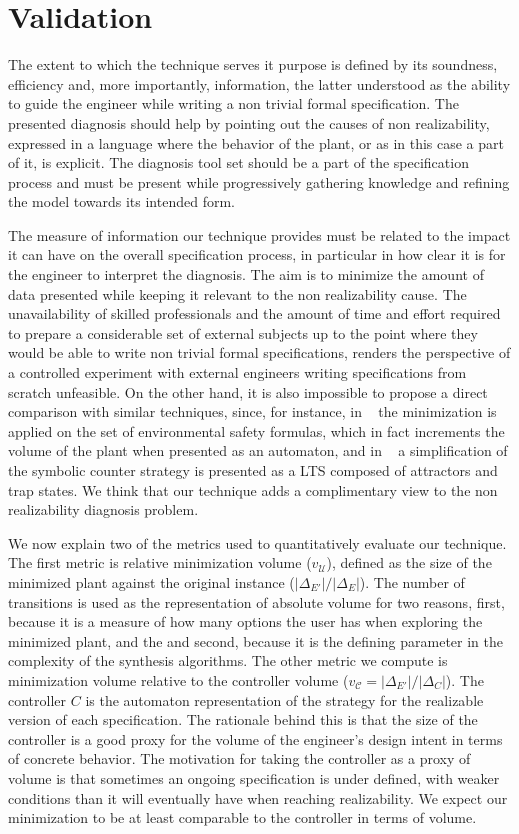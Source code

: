 \section{Validation}
The extent to which the technique serves it purpose is defined by its soundness, efficiency and, more importantly, information, the latter understood as the ability to guide the engineer while writing a non trivial formal specification. The presented diagnosis should help by pointing out the causes of non realizability, expressed in a language where the behavior of the plant, or as in this case a part of it, is explicit. The diagnosis tool set should be a part of the specification process and must be present while progressively gathering knowledge and refining the model towards its intended form.

The measure of information our technique provides must be related to the impact it can have on the overall specification process, in particular in how clear it is for the engineer  to interpret the diagnosis. The aim is to minimize the amount of data presented while keeping it relevant to the non realizability cause. The unavailability of skilled professionals and the amount of time and effort required to prepare a considerable set of external subjects up to the point where they would be able to write non trivial formal specifications, renders the perspective of a controlled experiment with external engineers writing specifications from scratch unfeasible. On the other hand, it is also impossible to propose a direct comparison with similar techniques, since, for instance, in ~\cite{DBLP:conf/hvc/KonighoferHB10} the minimization is applied on the set of environmental safety formulas, which in fact increments the volume of the plant when presented as an automaton, and in ~\cite{DBLP:conf/sigsoft/KuventMR17} a simplification of the symbolic counter strategy is presented as a LTS composed of attractors and trap states. We think that our technique adds a complimentary view to the non realizability diagnosis problem.

We now explain two of the metrics used to quantitatively evaluate our technique. The first metric is relative minimization volume ($v_{\mathcal{U}}$), defined as the size of the minimized plant against the original instance ($|\Delta_{E'}|/|\Delta_{E}|$). 
The number of transitions is used as the representation of absolute volume for two reasons, first, because it is a measure of how many options the user has when exploring the minimized plant, and the  and second, because it is the defining parameter in the complexity of the synthesis algorithms. 
The other metric we compute is minimization volume relative to the controller volume ($v_{\mathcal{C}}=|\Delta_{E'}|/|\Delta_{C}|$). The controller $C$ is the automaton representation of the strategy for the realizable version of each specification. The rationale behind this is that the size of the controller is a good proxy for the volume of the engineer's design intent in terms of concrete behavior. The motivation for taking the controller as a proxy of volume is that sometimes an ongoing specification is under defined, with weaker conditions than it will eventually have when reaching realizability. We expect our minimization to be at least comparable to the controller in terms of volume.

